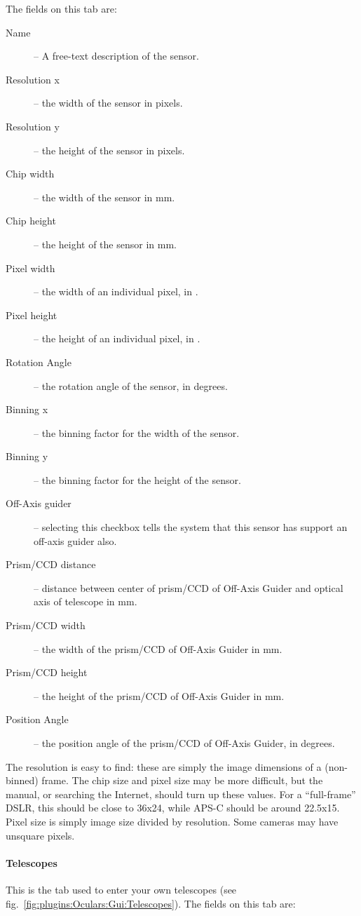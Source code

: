 The fields on this tab are:
\begin{description}
\item[Name] -- A free-text description of the sensor.
\item[Resolution x] -- the width of the sensor in pixels.
\item[Resolution y] -- the height of the sensor in pixels.
\item[Chip width] -- the width of the sensor in mm.
\item[Chip height] -- the height of the sensor in mm.
\item[Pixel width] -- the width of an individual pixel, in \um.
\item[Pixel height] -- the height of an individual pixel, in \um.
\item[Rotation Angle] -- the rotation angle of the sensor, in degrees.
\item[Binning x] -- the binning factor for the width of the sensor.
\item[Binning y] -- the binning factor for the height of the sensor.
\item[Off-Axis guider] -- selecting this checkbox tells the system that this sensor has support an off-axis guider also.
\item[Prism/CCD distance] -- distance between center of prism/CCD of Off-Axis Guider and optical axis of telescope in mm.
\item[Prism/CCD width] -- the width of the prism/CCD of Off-Axis Guider in mm.
\item[Prism/CCD height] -- the height of the prism/CCD of Off-Axis Guider in mm.
\item[Position Angle] -- the position angle of the prism/CCD of Off-Axis Guider, in degrees.
\end{description}

\noindent The resolution is easy to find: these are simply the image dimensions of a (non-binned) frame. 
The chip size and pixel size may be more difficult, but the manual, or searching the Internet, should turn up these values.  
For a ``full-frame'' DSLR, this should be close to 36x24\mm, while APS-C should be around 22.5x15\mm. 
Pixel size is simply image size divided by resolution. Some cameras may have unsquare pixels.

\paragraph{Telescopes}

This is the tab used to enter your own telescopes (see fig.~\ref{fig:plugins:Oculars:Gui:Telescopes}). The fields on this tab are:


